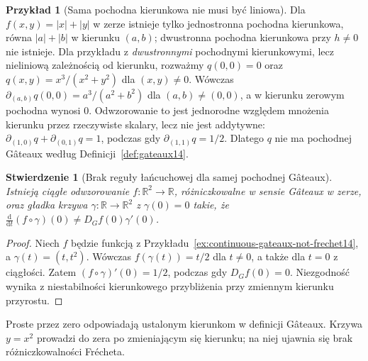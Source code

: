 \documentclass[11pt,a4paper]{article}
\numberwithin{equation}{section}
\theoremstyle{plain}
\newtheorem{stwierdzenie}[twierdzenie]{Stwierdzenie}
\theoremstyle{definition}
\newtheorem{przyklad}[twierdzenie]{Przykład}
\theoremstyle{remark}
\newcommand{\R}{\mathbb R}
\begin{document}
\begin{przyklad}[Sama pochodna kierunkowa nie musi być liniowa]
\label{ex:nonlinear-directional14}
Dla $f(x,y)=|x|+|y|$ w zerze istnieje tylko jednostronna pochodna kierunkowa, równa $|a|+|b|$ w kierunku $(a,b)$; dwustronna pochodna kierunkowa przy $h\ne0$ nie istnieje. Dla przykładu z \emph{dwustronnymi} pochodnymi kierunkowymi, lecz nieliniową zależnością od kierunku, rozważmy $q(0,0)=0$ oraz $q(x,y)=x^3/(x^2+y^2)$ dla $(x,y)\ne0$. Wówczas $\partial_{(a,b)}q(0,0)=a^3/(a^2+b^2)$ dla $(a,b)\ne(0,0)$, a w kierunku zerowym pochodna wynosi $0$. Odwzorowanie to jest jednorodne względem mnożenia kierunku przez rzeczywiste skalary, lecz nie jest addytywne: $\partial_{(1,0)}q+\partial_{(0,1)}q=1$, podczas gdy $\partial_{(1,1)}q=1/2$. Dlatego $q$ nie ma pochodnej Gâteaux według Definicji~\ref{def:gateaux14}.
\end{przyklad}

\begin{stwierdzenie}[Brak reguły łańcuchowej dla samej pochodnej Gâteaux]
\label{prop:chain-fails14}
Istnieją ciągłe odwzorowanie $f:\R^2\to\R$, różniczkowalne w sensie Gâteaux w zerze, oraz gładka krzywa $\gamma:\R\to\R^2$ z $\gamma(0)=0$ takie, że $\frac{\mathrm d}{\mathrm dt}(f\circ\gamma)(0)\ne D_Gf(0)\gamma'(0)$.
\end{stwierdzenie}
\begin{proof}
Niech $f$ będzie funkcją z Przykładu~\ref{ex:continuous-gateaux-not-frechet14}, a $\gamma(t)=(t,t^2)$. Wówczas $f(\gamma(t))=t/2$ dla $t\ne0$, a także dla $t=0$ z ciągłości. Zatem $(f\circ\gamma)'(0)=1/2$, podczas gdy $D_Gf(0)=0$. Niezgodność wynika z niestabilności kierunkowego przybliżenia przy zmiennym kierunku przyrostu.
\end{proof}

\begin{center}

{\small Proste przez zero odpowiadają ustalonym kierunkom w definicji
Gâteaux. Krzywa $y=x^2$ prowadzi do zera po zmieniającym się
kierunku; na niej ujawnia się brak różniczkowalności Frécheta.}
\end{center}
\end{document}
